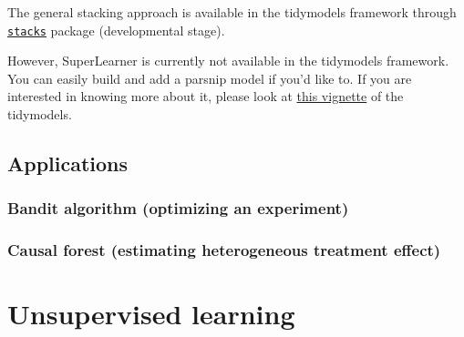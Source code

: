 \documentclass[
]{book}
\newenvironment{Shaded}{\begin{snugshade}}{\end{snugshade}}
\newcommand{\AttributeTok}[1]{\textcolor[rgb]{0.13,0.29,0.53}{#1}}
\newcommand{\CommentTok}[1]{\textcolor[rgb]{0.56,0.35,0.01}{\textit{#1}}}
\newcommand{\ConstantTok}[1]{\textcolor[rgb]{0.56,0.35,0.01}{#1}}
\newcommand{\DecValTok}[1]{\textcolor[rgb]{0.00,0.00,0.81}{#1}}
\newcommand{\FunctionTok}[1]{\textcolor[rgb]{0.13,0.29,0.53}{\textbf{#1}}}
\newcommand{\NormalTok}[1]{#1}
\newcommand{\OtherTok}[1]{\textcolor[rgb]{0.56,0.35,0.01}{#1}}
\newcommand{\SpecialCharTok}[1]{\textcolor[rgb]{0.81,0.36,0.00}{\textbf{#1}}}
\begin{document}
\begin{Shaded}
\end{Shaded}

The general stacking approach is available in the tidymodels framework through \href{https://github.com/tidymodels/stacks}{\texttt{stacks}} package (developmental stage).

However, SuperLearner is currently not available in the tidymodels framework. You can easily build and add a parsnip model if you'd like to. If you are interested in knowing more about it, please look at \href{https://www.tidymodels.org/learn/develop/models/}{this vignette} of the tidymodels.

\subsection{Applications}\label{applications-2}

\subsubsection{Bandit algorithm (optimizing an experiment)}\label{bandit-algorithm-optimizing-an-experiment}

\subsubsection{Causal forest (estimating heterogeneous treatment effect)}\label{causal-forest-estimating-heterogeneous-treatment-effect}

\section{Unsupervised learning}\label{unsupervised-learning}
\end{document}
